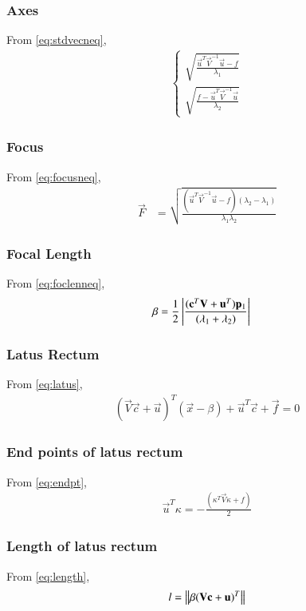 \documentclass[journal,12pt,twocolumn]{IEEEtran}
\begin{document}
\subsubsection{Axes}
From \eqref{eq:stdvecneq},
\begin{align}
\begin{cases}
    \sqrt{\frac{\vec{u}^T\vec{V}^{-1}\vec{u}-f}{\lambda_1}}
    \\
    \sqrt{\frac{f-\vec{u}^T\vec{V}^{-1}\vec{u}}{\lambda_2}}
\end{cases}
\end{align}
\subsubsection{Focus}
From \eqref{eq:focusneq},
\begin{align}
    \vec{F} &= \sqrt{\frac{(\vec{u}^T\vec{V}^{-1}\vec{u}-f)(\lambda_2-\lambda_1)}{\lambda_1\lambda_2}}
\end{align}
\subsubsection{Focal Length}
From \eqref{eq:foclenneq},
\begin{align}
    \beta &= \frac{1}{2}\left\vert\frac{(\mathbf{c}^T\mathbf{V}+\mathbf{u}^T)\mathbf{p}_1}{(\lambda_1+\lambda_2)}\right\vert 
\end{align}
\subsubsection{Latus Rectum}
From \eqref{eq:latus},
\begin{align}
    (\vec{V}\vec{c}+\vec{u})^T(\vec{x} -\beta) + \vec{u}^T\vec{c} + \vec{f} = 0
\end{align}
\subsubsection{End points of latus rectum}
From \eqref{eq:endpt},
\begin{align}
    \vec{u}^T\kappa = -\frac{(\kappa^T\vec{V}\kappa + f )}{2}
\end{align}
\subsubsection{Length of latus rectum}
From \eqref{eq:length},
\begin{align}
   l=\left\lVert\beta(\mathbf{V}\mathbf{c}+\mathbf{u})^T\right\rVert 
\end{align}
\end{document}
